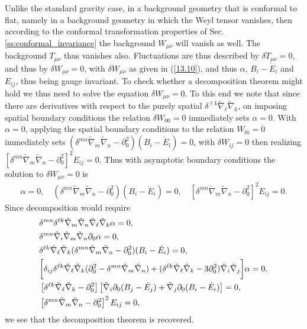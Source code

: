 Unlike the standard gravity case, in a background geometry that is conformal to flat, namely in a background geometry in which the Weyl tensor vanishes,  then according to the conformal transformation properties of Sec. \ref{ss:conformal_invariance} the background $W_{\mu\nu}$ will vanish as well. The background $T_{\mu\nu}$ thus vanishes also. Fluctuations are thus described by $\delta T_{\mu\nu}=0$, and thus by $\delta W_{\mu\nu}=0$, with $\delta W_{\mu\nu}$ as given in (\ref{13.10}), and thus $\alpha$, $B_i-\dot{E}_i$ and $E_{ij}$,  thus being gauge invariant. To check whether a decomposition theorem might hold we thus need to solve the equation $\delta W_{\mu\nu}=0$. To this end we note that since there are derivatives with respect to the purely spatial $\delta^{\ell k}\tilde{\nabla}_{\ell}\tilde{\nabla}_k$, on imposing spatial boundary conditions the relation $\delta W_{00}=0$ immediately sets $\alpha=0$.  With $\alpha=0$, applying the spatial boundary conditions to the relation $W_{0i}=0$ immediately sets $(\delta^{mn}\tilde{\nabla}_m\tilde{\nabla}_n-\partial_0^2)(B_i - \dot{E}_i)=0$, with $\delta W_{ij}=0$ then realizing $\left[\delta^{mn}\tilde{\nabla}_m\tilde{\nabla}_n-\partial_0^2\right]^2E_{ij}=0$. Thus with asymptotic boundary conditions the solution to $\delta W_{\mu\nu}=0$ is
%
\begin{eqnarray}
\alpha=0,\quad (\delta^{mn}\tilde{\nabla}_m\tilde{\nabla}_n-\partial_0^2)(B_i - \dot{E}_i)=0,\quad \left[\delta^{mn}\tilde{\nabla}_m\tilde{\nabla}_n-\partial_0^2\right]^2E_{ij}=0.
\label{13.11}
\end{eqnarray}
%
Since decomposition would require
%
\begin{align}
&\delta^{mn}\delta^{\ell k}\tilde{\nabla}_m\tilde{\nabla}_n\tilde{\nabla}_{\ell}\tilde{\nabla}_k \alpha=0, 
\nonumber\\
&\delta^{mn}\tilde{\nabla}_i\tilde{\nabla}_m\tilde{\nabla}_n\partial_0\alpha=0,
\nonumber\\
&\delta^{\ell k}\tilde{\nabla}_{\ell}\tilde{\nabla}_k(\delta^{mn}\tilde{\nabla}_m\tilde{\nabla}_n-\partial_0^2)(B_i - \dot{E}_i)=0,
\nonumber\\
&\bigg{[} \delta_{ij}\delta^{\ell k}\tilde{\nabla}_{\ell}\tilde{\nabla}_k (\partial_0^2 - \delta^{mn}\tilde{\nabla}_m\tilde{\nabla}_n) 
+(\delta^{\ell k}\tilde{\nabla}_{\ell}\tilde{\nabla}_k -3\partial_0^2)\tilde{\nabla}_i\tilde{\nabla}_j  
\bigg{] }\alpha=0,
\nonumber\\
&\left[\delta^{\ell k}\tilde{\nabla}_{\ell}\tilde{\nabla}_k -\partial_0^2\right]\left[\tilde{\nabla}_i   \partial_0(B_j - \dot{E}_j)+ \tilde{\nabla}_j \partial_0(B_i - \dot{E}_i)\right]=0,
\nonumber\\
& \left[\delta^{mn}\tilde{\nabla}_m\tilde{\nabla}_n-\partial_0^2\right]^2E_{ij}=0,
\label{13.12}
\end{align}
%
we see that the decomposition theorem is recovered.

